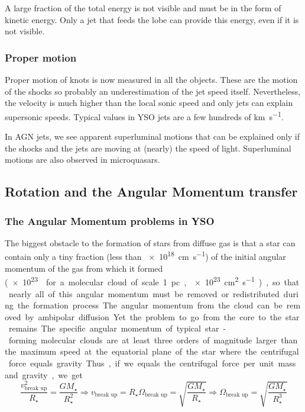 \documentclass[10pt,a4paper,english,draft]{article}
\begin{document}
A large fraction of the total energy is not visible and must be in the form of kinetic energy. Only a jet that feeds the lobe can provide this energy, even if it is not visible.
\subsubsection{Proper motion}
Proper motion of knots is now measured in all the objects. These are the motion of the shocks so probably an underestimation of the jet speed itself. Nevertheless, the velocity is much higher than the local sonic speed and only jets can explain supersonic speeds. Typical values in YSO jets are a few hundreds of \si{\km\per\s}.


In AGN jets, we see apparent superluminal motions that can be explained only if the shocks and the jets are moving at (nearly) the speed of light. Superluminal motions are also observed in microquasars.
\subsection{Rotation and the Angular Momentum transfer}
\subsubsection{The Angular Momentum problems in YSO}
The biggest obstacle to the formation of stars from diffuse gas is that a star can contain only a tiny fraction (less than \SI{e18}{\cm\per\s}) of the initial angular momentum of the gas from which it formed (\SI{e23}{\cm\square\per\s} for a molecular cloud of scale \SI{1}{pc}, \SI{e23}{\cm\squared\per\s}), so that nearly all of this angular momentum must be removed or redistributed during the formation process. The angular momentum from the cloud can be removed by ambipolar diffusion. Yet the problem to go from the core to the star remains.

The specific angular momentum of typical star-forming molecular clouds are at least three orders of magnitude larger than the maximum speed at the equatorial plane of the star where the centrifugal force equals gravity. Thus, if we equals the centrifugal force per unit mass and gravity, we get
\begin{equation}
  \frac{v^2_\textrm{break up}}{R_\star} = \frac{GM_\star}{R_\star^2}
  \Rightarrow v_\textrm{break up} = R_\star \Omega_\textrm{break up} = \sqrt{\frac{GM_\star}{R_\star}}
  \Rightarrow \Omega_\textrm{break up} = \sqrt{\frac{GM_\star}{R_\star^3}}
\end{equation}
\end{document}
